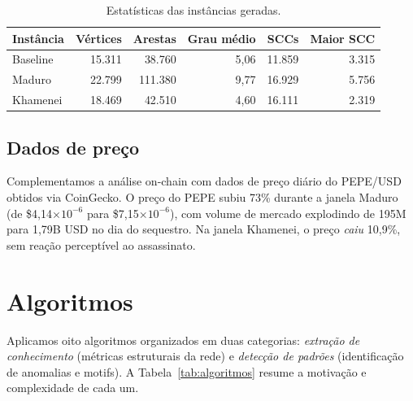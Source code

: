 \documentclass[12pt,a4paper]{article}
\begin{document}
\begin{table}[H]
\centering
\caption{Estatísticas das instâncias geradas.}
\label{tab:instancias}
\begin{tabular}{lrrrrr}
\toprule
Instância & Vértices & Arestas & Grau médio & SCCs & Maior SCC \\
\midrule
Baseline        & 15.311  & 38.760   & 5,06  & 11.859 & 3.315 \\
Maduro          & 22.799  & 111.380  & 9,77  & 16.929 & 5.756 \\
Khamenei        & 18.469  & 42.510   & 4,60  & 16.111 & 2.319 \\
\bottomrule
\end{tabular}
\end{table}

\subsection{Dados de preço}

Complementamos a análise on-chain com dados de preço diário do PEPE/USD obtidos via CoinGecko. O preço do PEPE subiu 73\% durante a janela Maduro (de \$4,14$\times10^{-6}$ para \$7,15$\times10^{-6}$), com volume de mercado explodindo de 195M para 1,79B USD no dia do sequestro. Na janela Khamenei, o preço \textit{caiu} 10,9\%, sem reação perceptível ao assassinato.

\section{Algoritmos}

Aplicamos oito algoritmos organizados em duas categorias: \textit{extração de conhecimento} (métricas estruturais da rede) e \textit{detecção de padrões} (identificação de anomalias e motifs). A Tabela~\ref{tab:algoritmos} resume a motivação e complexidade de cada um.
\end{document}
